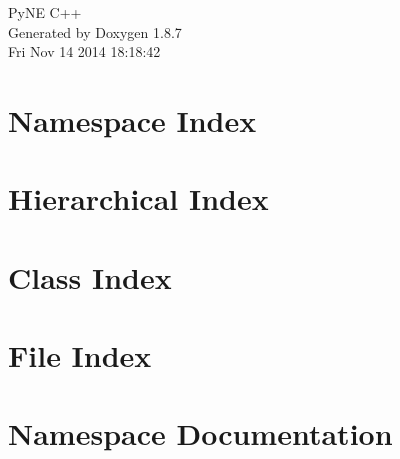 \documentclass[twoside]{book}
\newcommand{\+}{\discretionary{\mbox{\scriptsize$\hookleftarrow$}}{}{}}
\newcommand{\clearemptydoublepage}{%
  \newpage{\pagestyle{empty}\cleardoublepage}%
}
\begin{document}
\hypersetup{pageanchor=false,
             bookmarks=true,
             bookmarksnumbered=true,
             pdfencoding=unicode
            }
\begin{titlepage}
\vspace*{7cm}
\begin{center}%
{\Large Py\+N\+E C++ }\\
\vspace*{1cm}
{\large Generated by Doxygen 1.8.7}\\
\vspace*{0.5cm}
{\small Fri Nov 14 2014 18:18:42}\\
\end{center}
\end{titlepage}
\clearemptydoublepage
\tableofcontents
\clearemptydoublepage
{}
\hypersetup{pageanchor=true}

\chapter{Namespace Index}

\chapter{Hierarchical Index}

\chapter{Class Index}

\chapter{File Index}

\chapter{Namespace Documentation}















\end{document}
